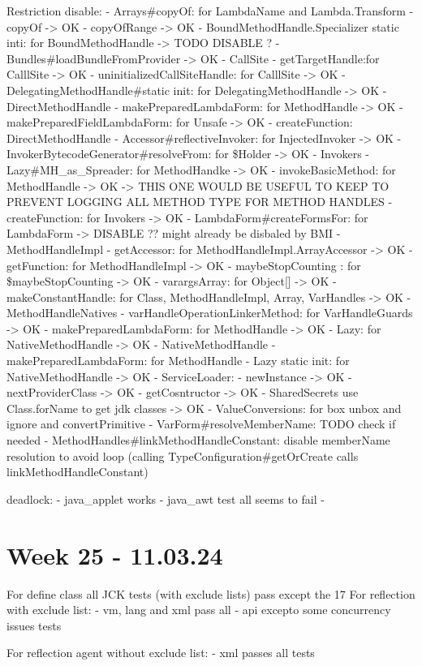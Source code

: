 Restriction disable:
- Arrays#copyOf: for LambdaName and Lambda.Transform
    - copyOf -> OK
    - copyOfRange -> OK
- BoundMethodHandle.Specializer static inti: for BoundMethodHandle -> TODO DISABLE ?
- Bundles#loadBundleFromProvider -> OK
- CallSite
    - getTargetHandle:for CalllSite -> OK
    - uninitializedCallSiteHandle: for CalllSite -> OK
- DelegatingMethodHandle#static init: for DelegatingMethodHandle -> OK
- DirectMethodHandle
    - makePreparedLambdaForm: for MethodHandle -> OK
    - makePreparedFieldLambdaForm: for Unsafe -> OK
    - createFunction: DirectMethodHandle
    - Accessor#reflectiveInvoker: for InjectedInvoker -> OK
- InvokerBytecodeGenerator#resolveFrom: for \$Holder -> OK
- Invokers
    - Lazy#MH_as_Spreader: for MethodHandke -> OK
    - invokeBasicMethod: for MethodHandle -> OK -> THIS ONE WOULD BE USEFUL TO KEEP TO PREVENT LOGGING ALL METHOD TYPE FOR METHOD HANDLES
    - createFunction: for Invokers -> OK
- LambdaForm#createFormsFor: for LambdaForm -> DISABLE ?? might already be disbaled by BMI    
- MethodHandleImpl
    - getAccessor: for MethodHandleImpl.ArrayAccessor -> OK
    - getFunction: for MethodHandleImpl -> OK
    - maybeStopCounting : for \$maybeStopCounting -> OK
    - varargsArray: for Object[] -> OK
    - makeConstantHandle: for Class, MethodHandleImpl, Array, VarHandles -> OK
- MethodHandleNatives
    - varHandleOperationLinkerMethod: for VarHandleGuards -> OK
    - makePreparedLambdaForm: for MethodHandle -> OK
    - Lazy: for NativeMethodHandle -> OK
- NativeMethodHandle
    - makePreparedLambdaForm: for MethodHandle
    - Lazy static init: for NativeMethodHandle -> OK
- ServiceLoader: 
    - newInstance -> OK
    - nextProviderClass -> OK
    - getCosntructor -> OK
- SharedSecrets use Class.forName to get jdk classes -> OK
- ValueConversions: for box unbox and ignore and convertPrimitive
- VarForm#resolveMemberName: TODO check if needed
- MethodHandles#linkMethodHandleConstant: disable memberName resolution to avoid loop (calling TypeConfiguration#getOrCreate calls linkMethodHandleConstant)


deadlock:
- java_applet works
- java_awt test all seems to fail
-

\section{Week 25 - 11.03.24}

For define class all JCK tests (with exclude lists) pass except the 17
For reflection with exclude list:
- vm, lang and xml pass all 
- api excepto some concurrency issues tests

For reflection agent without exclude list:
- xml passes all tests